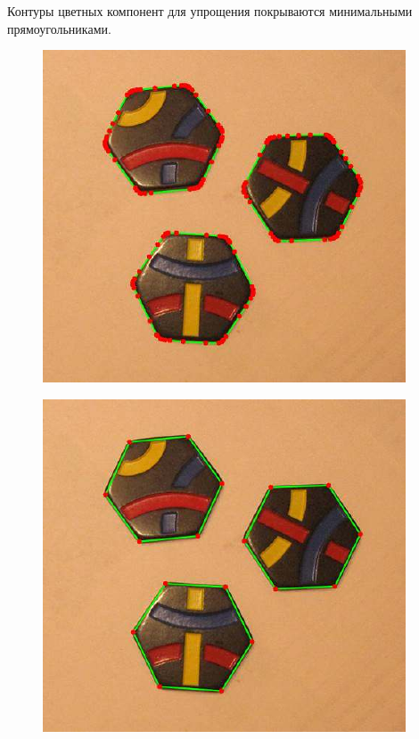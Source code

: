 \documentclass[10pt]{article}
\begin{document}
	Контуры цветных компонент для упрощения покрываются минимальными прямоугольниками.
	
	\begin{figure}[h]
		\begin{minipage}[h]{0.22\linewidth}
			\begin{center}
				{\includegraphics[width=1.0\linewidth]{data/contour_points_example.pdf}}
			\end{center}
		\end{minipage}
		\hfill
		\begin{minipage}[h]{0.22\linewidth}
			\begin{center}
				{\includegraphics[width=1.0\linewidth]{data/hex_points_example.pdf}}

\end{center}
\end{minipage}
\end{figure}
\end{document}
